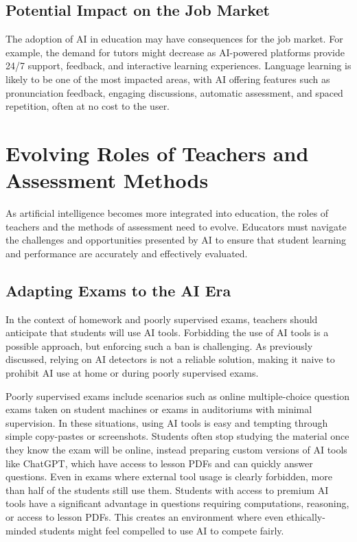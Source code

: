 \documentclass{article}
\begin{document}
\subsection{Potential Impact on the Job Market}

The adoption of AI in education may have consequences for the job market.
For example, the demand for tutors might decrease as AI-powered platforms
provide 24/7 support, feedback, and interactive learning experiences.
Language learning is likely to be one of the most impacted areas, with
AI offering features such as pronunciation feedback, engaging discussions,
automatic assessment, and spaced repetition, often at no cost to the user.






\newpage

\section{Evolving Roles of Teachers and Assessment Methods}

As artificial intelligence becomes more integrated into education,
the roles of teachers and the methods of assessment need to evolve.
Educators must navigate the challenges and opportunities presented
by AI to ensure that student learning and performance are accurately
and effectively evaluated.

\subsection{Adapting Exams to the AI Era}

In the context of homework and poorly supervised exams, teachers
should anticipate that students will use AI tools. Forbidding the
use of AI tools is a possible approach, but enforcing such a ban
is challenging. As previously discussed, relying on AI detectors
is not a reliable solution, making it naive to prohibit AI use at
home or during poorly supervised exams.

Poorly supervised exams include scenarios such as online multiple-choice
question exams taken on student machines or exams in auditoriums with
minimal supervision. In these situations, using AI tools is easy and
tempting through simple copy-pastes or screenshots. Students often stop
studying the material once they know the exam will be online,
instead preparing custom versions of AI tools like ChatGPT,
which have access to lesson PDFs and can quickly answer questions.
Even in exams where external tool usage is clearly forbidden,
more than half of the students still use them. Students with access
to premium AI tools have a significant advantage in questions requiring
computations, reasoning, or access to lesson PDFs. This creates an environment
where even ethically-minded students might feel compelled to use AI to compete
fairly.
\end{document}
